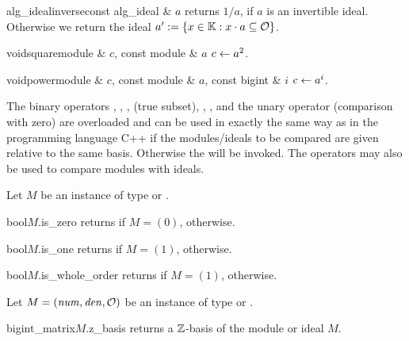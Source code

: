 \begin{fcode}{alg_ideal}{inverse}{const alg_ideal & $a$}
  returns $1 / a$, if $a$ is an invertible ideal.  Otherwise we return the ideal $a':=\{ x \in
  \mathbb{K} : x \cdot a \subseteq \mathcal{O} \}$.
\end{fcode}

\begin{fcode}{void}{square}{module & $c$, const module & $a$}
  $c \leftarrow a^2$.
\end{fcode}

\begin{fcode}{void}{power}{module & $c$, const module & $a$, const bigint & $i$}
  $c \leftarrow a^i$.
\end{fcode}



\COMP

The binary operators \code{==}, \code{!=}, \code{<=}, \code{<} (true subset), \code{>=},
\code{>}, and the unary operator \code{!} (comparison with zero) are overloaded and can be used
in exactly the same way as in the programming language C++ if the modules/ideals to be compared
are given relative to the same basis.  Otherwise the \LEH will be invoked.  The operators may
also be used to compare modules with ideals.

Let $M$ be an instance of type  or .

\begin{cfcode}{bool}{$M$.is_zero}{}
  returns \TRUE if $M = (0)$, \FALSE otherwise.
\end{cfcode}

\begin{cfcode}{bool}{$M$.is_one}{}
  returns \TRUE if $M = (1)$, \FALSE otherwise.
\end{cfcode}

\begin{cfcode}{bool}{$M$.is_whole_order}{}
  returns \TRUE if $M = (1)$, \FALSE otherwise.
\end{cfcode}



\BASIC

Let $M = (\mathit{num}, \mathit{den}, \mathcal{O})$ be an instance of type  or .

\begin{cfcode}{bigint_matrix}{$M$.z_basis}{}
  returns a $\mathbb{Z}$-basis of the module or ideal $M$.
\end{cfcode}

